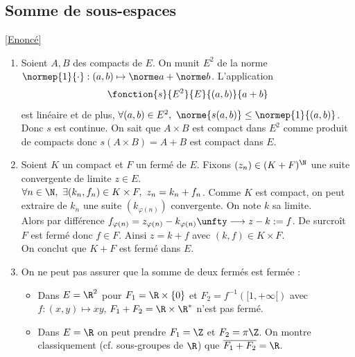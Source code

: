 \documentclass{book}
\begin{document}
	\subsection{Somme de sous-espaces }
	\label{sec:somme-de-sous-espaces}
	\textcolor{blue}{\hyperref[Somme de sous-espaces]{[Enoncé]}}\\
	\begin{enumerate}[leftmargin=*]
		\item Soient $A,B$ des compacts de $E$. On munit $E^2$ de la norme $\normep{1}{\cdot}:(a,b)\mapsto \norme a+\norme b$. L'application
		$$\fonction{s}{E^2}{E}{(a,b)}{a+b}$$
		est linéaire et de plus, $\forall (a,b)\in E^2,\ \norme{s(a,b)}\leq \normep{1}{(a,b)}$. Donc $s$ est continue. On sait que $A\times B$ est compact dans $E^2$ comme produit de compacts donc $s(A\times B)=A+B$ est compact dans $E$.
		\item Soient $K$ un compact et $F$ un fermé de $E$. Fixons $(z_n)\in (K+F)^\N$ une suite convergente de limite $z\in E$.\\
		$\forall n\in \N,\ \exists (k_n,f_n)\in K\times F,\ z_n=k_n+f_n$. Comme $K$ est compact, on peut extraire de $k_n$ une suite $(k_{\varphi(n)})$ convergente. On note $k$ sa limite.\\
		Alors par différence $f_{\varphi(n)}=z_{\varphi(n)}-k_{\varphi(n)}\unfty\longrightarrow z-k:=f$. De surcroît $F$ est fermé donc $f\in F$. Ainsi $z=k+f$ avec $(k,f)\in K\times F$.\\
		On conclut que $K+F$ est fermé dans $E$.
		\item On ne peut pas assurer que la somme de deux fermés est fermée :
		\begin{itemize}
			\item Dans $E=\R^2$ pour $F_1=\R\times\{0\}$ et $F_2=f^{-1}([1,+\infty[)$ avec $f:(x,y)\mapsto xy$, $F_1+F_2=\R\times \R^*$ n'est pas fermé.
			\item Dans $E=\R$ on peut prendre $F_1=\Z$ et $F_2=\pi\Z$. On montre classiquement (cf. sous-groupes de $\R$) que $\overline{F_1+F_2}=\R$.
		\end{itemize}
	\end{enumerate}
	
\end{document}
